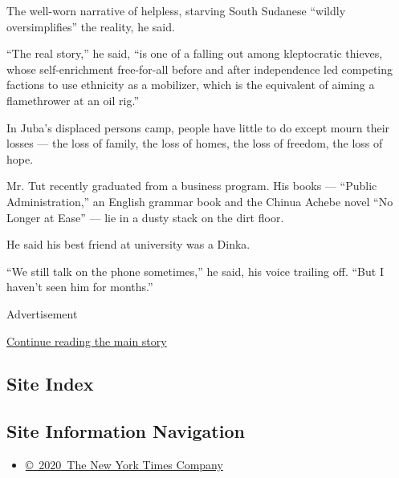 The well-worn narrative of helpless, starving South Sudanese ``wildly
oversimplifies'' the reality, he said.

``The real story,'' he said, ``is one of a falling out among
kleptocratic thieves, whose self-enrichment free-for-all before and
after independence led competing factions to use ethnicity as a
mobilizer, which is the equivalent of aiming a flamethrower at an oil
rig.''

In Juba's displaced persons camp, people have little to do except mourn
their losses --- the loss of family, the loss of homes, the loss of
freedom, the loss of hope.

Mr. Tut recently graduated from a business program. His books ---
``Public Administration,'' an English grammar book and the Chinua Achebe
novel ``No Longer at Ease'' --- lie in a dusty stack on the dirt floor.

He said his best friend at university was a Dinka.

``We still talk on the phone sometimes,'' he said, his voice trailing
off. ``But I haven't seen him for months.''

Advertisement

\protect\hyperlink{after-bottom}{Continue reading the main story}

\hypertarget{site-index}{%
\subsection{Site Index}\label{site-index}}

\hypertarget{site-information-navigation}{%
\subsection{Site Information
Navigation}\label{site-information-navigation}}

\begin{itemize}
\tightlist
\item
  \href{https://help.nytimes3xbfgragh.onion/hc/en-us/articles/115014792127-Copyright-notice}{©~2020~The
  New York Times Company}
\end{itemize}

